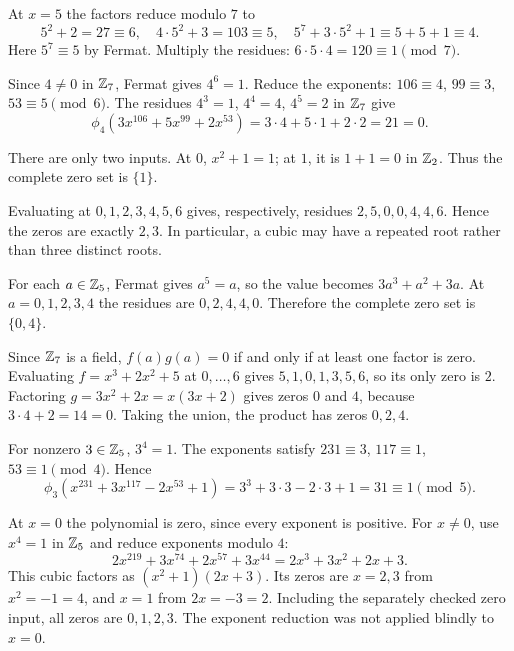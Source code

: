At $x=5$ the factors reduce modulo $7$ to
\[5^2+2=27\equiv6,\quad4\cdot5^2+3=103\equiv5,\quad
5^7+3\cdot5^2+1\equiv5+5+1\equiv4.
\]
Here $5^7\equiv5$ by Fermat. Multiply the residues: $6\cdot5\cdot4=120\equiv\boxed1\pmod7$.

Since $4\ne0$ in $\mathbb{Z}_7$, Fermat gives $4^6=1$. Reduce the exponents: $106\equiv4$, $99\equiv3$, $53\equiv5\pmod6$. The residues $4^3=1$, $4^4=4$, $4^5=2$ in $\mathbb{Z}_7$ give
\[\phi_4(3x^{106}+5x^{99}+2x^{53})=3\cdot4+5\cdot1+2\cdot2=21=\boxed0.
\]

There are only two inputs. At $0$, $x^2+1=1$; at $1$, it is $1+1=0$ in $\mathbb{Z}_2$. Thus the complete zero set is $\boxed{\{1\}}$.

Evaluating at $0,1,2,3,4,5,6$ gives, respectively, residues $2,5,0,0,4,4,6$. Hence the zeros are exactly $\boxed{2,3}$. In particular, a cubic may have a repeated root rather than three distinct roots.

For each $a\in\mathbb{Z}_5$, Fermat gives $a^5=a$, so the value becomes $3a^3+a^2+3a$. At $a=0,1,2,3,4$ the residues are $0,2,4,4,0$. Therefore the complete zero set is $\boxed{\{0,4\}}$.

Since $\mathbb{Z}_7$ is a field, $f(a)g(a)=0$ if and only if at least one factor is zero. Evaluating $f=x^3+2x^2+5$ at $0,\ldots,6$ gives $5,1,0,1,3,5,6$, so its only zero is $2$. Factoring $g=3x^2+2x=x(3x+2)$ gives zeros $0$ and $4$, because $3\cdot4+2=14=0$. Taking the union, the product has zeros $\boxed{0,2,4}$.

For nonzero $3\in\mathbb{Z}_5$, $3^4=1$. The exponents satisfy $231\equiv3$, $117\equiv1$, $53\equiv1\pmod4$. Hence
\[\phi_3(x^{231}+3x^{117}-2x^{53}+1)=3^3+3\cdot3-2\cdot3+1=31\equiv\boxed1\pmod5.
\]

At $x=0$ the polynomial is zero, since every exponent is positive. For $x\ne0$, use $x^4=1$ in $\mathbb{Z}_5$ and reduce exponents modulo $4$:
\[2x^{219}+3x^{74}+2x^{57}+3x^{44}=2x^3+3x^2+2x+3.
\]
This cubic factors as $(x^2+1)(2x+3)$. Its zeros are $x=2,3$ from $x^2=-1=4$, and $x=1$ from $2x=-3=2$. Including the separately checked zero input, all zeros are $\boxed{0,1,2,3}$. The exponent reduction was not applied blindly to $x=0$.

